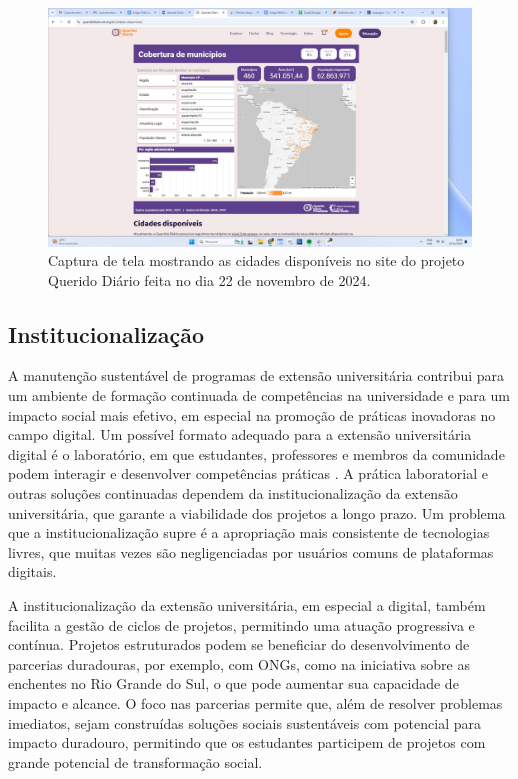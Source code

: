 \documentclass[portuguese]{textolivre}
\begin{document}
\begin{figure}[htbp]
\centering
\begin{minipage}{.75\textwidth}
 \includegraphics[width=\textwidth]{figure02.jpg}
 \caption{Captura de tela mostrando as cidades disponíveis no site do
projeto Querido Diário feita no dia 22 de novembro de 2024.}
 \label{fig02}
\end{minipage}
\end{figure}


\subsection{Institucionalização}

A manutenção sustentável de programas de extensão universitária
contribui para um ambiente de formação continuada de competências na
universidade e para um impacto social mais efetivo, em especial na
promoção de práticas inovadoras no campo digital. Um possível formato
adequado para a extensão universitária digital é o laboratório, em que
estudantes, professores e membros da comunidade podem interagir e
desenvolver competências práticas \cite{Girardi2024}. A
prática laboratorial e outras soluções continuadas dependem da
institucionalização da extensão universitária, que garante a viabilidade
dos projetos a longo prazo. Um problema que a institucionalização supre
é a apropriação mais consistente de tecnologias livres, que muitas vezes
são negligenciadas por usuários comuns de plataformas digitais.

A institucionalização da extensão universitária, em especial a digital,
também facilita a gestão de ciclos de projetos, permitindo uma atuação
progressiva e contínua. Projetos estruturados podem se beneficiar do
desenvolvimento de parcerias duradouras, por exemplo, com ONGs, como na
iniciativa sobre as enchentes no Rio Grande do Sul, o que pode aumentar
sua capacidade de impacto e alcance. O foco nas parcerias permite que,
além de resolver problemas imediatos, sejam construídas soluções sociais
sustentáveis com potencial para impacto duradouro, permitindo que os
estudantes participem de projetos com grande potencial de transformação
social.
\end{document}
